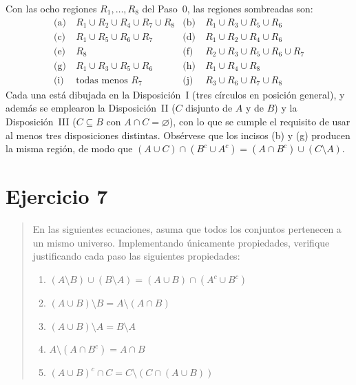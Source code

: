 \documentclass[11pt]{article}
\begin{document}
\begin{resp}
Con las ocho regiones $R_{1},\dots,R_{8}$ del Paso~0, las regiones sombreadas son:
\begin{align*}
	\text{(a)}\ & R_{1}\cup R_{2}\cup R_{4}\cup R_{7}\cup R_{8} &
	\text{(b)}\ & R_{1}\cup R_{3}\cup R_{5}\cup R_{6}\\
	\text{(c)}\ & R_{1}\cup R_{5}\cup R_{6}\cup R_{7} &
	\text{(d)}\ & R_{1}\cup R_{2}\cup R_{4}\cup R_{6}\\
	\text{(e)}\ & R_{8} &
	\text{(f)}\ & R_{2}\cup R_{3}\cup R_{5}\cup R_{6}\cup R_{7}\\
	\text{(g)}\ & R_{1}\cup R_{3}\cup R_{5}\cup R_{6} &
	\text{(h)}\ & R_{1}\cup R_{4}\cup R_{8}\\
	\text{(i)}\ & \text{todas menos } R_{7} &
	\text{(j)}\ & R_{3}\cup R_{6}\cup R_{7}\cup R_{8}
\end{align*}
Cada una está dibujada en la Disposición~I (tres círculos en posición general), y además se
emplearon la Disposición~II ($C$ disjunto de $A$ y de $B$) y la Disposición~III ($C\subseteq B$
con $A\cap C=\varnothing$), con lo que se cumple el requisito de usar al menos tres disposiciones
distintas. Obsérvese que los incisos (b) y (g) producen la misma región, de modo que
$(A\cup C)\cap(B^{c}\cup A^{c})=(A\cap B^{c})\cup(C\setminus A)$.
\end{resp}

\section*{Ejercicio 7}

\begin{quote}
En las siguientes ecuaciones, asuma que todos los conjuntos pertenecen a un mismo universo.
Implementando únicamente propiedades, verifique justificando cada paso las siguientes
propiedades:

\begin{enumerate}[label=(\alph*),leftmargin=*]
	\item $(A\setminus B)\cup(B\setminus A)=(A\cup B)\cap(A^{c}\cup B^{c})$
	\item $(A\cup B)\setminus B=A\setminus(A\cap B)$
	\item $(A\cup B)\setminus A=B\setminus A$
	\item $A\setminus(A\cap B^{c})=A\cap B$
	\item $(A\cup B)^{c}\cap C=C\setminus(C\cap(A\cup B))$
\end{enumerate}
\end{quote}
\end{document}
